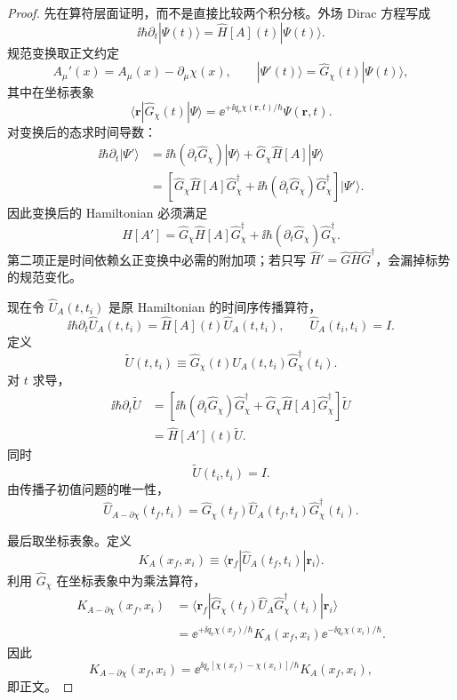 \begin{proof}
先在算符层面证明，而不是直接比较两个积分核。外场 Dirac 方程写成
\[
\ii\hbar\partial_t|\Psi(t)\rangle
=
\hat H[A](t)|\Psi(t)\rangle .
\]
规范变换取正文约定
\[
A_\mu'(x)=A_\mu(x)-\partial_\mu\chi(x),
\qquad
|\Psi'(t)\rangle
=
\hat G_\chi(t)|\Psi(t)\rangle,
\]
其中在坐标表象
\[
\langle\mathbf r|\hat G_\chi(t)|\Psi\rangle
=
\ee^{+\ii q_{\mathrm e}\chi(\mathbf r,t)/\hbar}
\Psi(\mathbf r,t).
\]
对变换后的态求时间导数：
\begin{align*}
\ii\hbar\partial_t|\Psi'\rangle
&=
\ii\hbar(\partial_t\hat G_\chi)|\Psi\rangle
+\hat G_\chi\hat H[A]|\Psi\rangle\\
&=
\left[
\hat G_\chi\hat H[A]\hat G_\chi^\dagger
+\ii\hbar(\partial_t\hat G_\chi)\hat G_\chi^\dagger
\right]
|\Psi'\rangle.
\end{align*}
因此变换后的 Hamiltonian 必须满足
\[
\hat H[A']
=
\hat G_\chi\hat H[A]\hat G_\chi^\dagger
+\ii\hbar(\partial_t\hat G_\chi)\hat G_\chi^\dagger.
\]
第二项正是时间依赖幺正变换中必需的附加项；若只写
\(\hat H'\!=\hat G\hat H\hat G^\dagger\)，会漏掉标势的规范变化。

现在令 \(\hat U_A(t,t_i)\) 是原 Hamiltonian 的时间序传播算符，
\[
\ii\hbar\partial_t\hat U_A(t,t_i)
=
\hat H[A](t)\hat U_A(t,t_i),
\qquad
\hat U_A(t_i,t_i)=I.
\]
定义
\[
\widetilde U(t,t_i)
\equiv
\hat G_\chi(t)\hat U_A(t,t_i)\hat G_\chi^\dagger(t_i).
\]
对 \(t\) 求导，
\begin{align*}
\ii\hbar\partial_t\widetilde U
&=
\left[
\ii\hbar(\partial_t\hat G_\chi)\hat G_\chi^\dagger
+\hat G_\chi\hat H[A]\hat G_\chi^\dagger
\right]\widetilde U\\
&=
\hat H[A'](t)\widetilde U.
\end{align*}
同时
\[
\widetilde U(t_i,t_i)=I.
\]
由传播子初值问题的唯一性，
\[
\boxed{
\hat U_{A-\partial\chi}(t_f,t_i)
=
\hat G_\chi(t_f)
\hat U_A(t_f,t_i)
\hat G_\chi^\dagger(t_i).
}
\]

最后取坐标表象。定义
\[
K_A(x_f,x_i)
\equiv
\langle\mathbf r_f|
\hat U_A(t_f,t_i)
|\mathbf r_i\rangle .
\]
利用 \(\hat G_\chi\) 在坐标表象中为乘法算符，
\begin{align*}
K_{A-\partial\chi}(x_f,x_i)
&=
\langle\mathbf r_f|
\hat G_\chi(t_f)\hat U_A
\hat G_\chi^\dagger(t_i)
|\mathbf r_i\rangle\\
&=
\ee^{+\ii q_{\mathrm e}\chi(x_f)/\hbar}
K_A(x_f,x_i)
\ee^{-\ii q_{\mathrm e}\chi(x_i)/\hbar}.
\end{align*}
因此
\[
\boxed{
K_{A-\partial\chi}(x_f,x_i)
=
\ee^{\ii q_{\mathrm e}[\chi(x_f)-\chi(x_i)]/\hbar}
K_A(x_f,x_i),
}
\]
即正文。
\end{proof}

